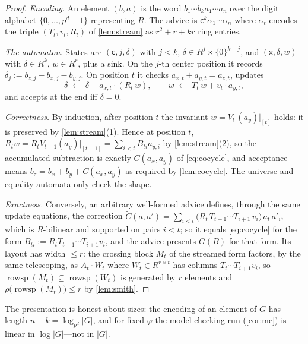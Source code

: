 \documentclass[a4paper,UKenglish,autoref,anonymous]{lipics-v2021}
\newcommand{\R}{R}                                   %
\newcommand{\rs}{\operatorname{rowsp}}
\newcommand{\mrk}{\rho}                              %
\begin{document}
\begin{proof}
\emph{Encoding.} An element $(b, a)$ is the word $b_1 \cdots b_k a_1
\cdots a_n$ over the digit alphabet $\{0, \dots, p^d - 1\}$
representing $\R$. The advice is $\mathsf{c}^k \alpha_1 \cdots \alpha_n$
where $\alpha_t$ encodes the triple $(T_t, v_t, R_t)$ of
\autoref{lem:stream} as $r^2 + r + kr$ ring entries.

\emph{The automaton.} States are $(\mathsf{c}, j, \delta)$ with $j < k$,
$\delta \in \R^{j} \times \{0\}^{k-j}$, and $(\mathsf{x}, \delta, w)$
with $\delta \in \R^k$, $w \in \R^r$, plus a sink. On the $j$-th center
position it records $\delta_j := b_{z,j} - b_{x,j} - b_{y,j}$. On
position $t$ it checks $a_{x,t} + a_{y,t} = a_{z,t}$, updates
\[
  \delta \;\leftarrow\; \delta - a_{x,t} \cdot (R_t\, w), \qquad
  w \;\leftarrow\; T_t\, w + v_t \cdot a_{y,t},
\]
and accepts at the end iff $\delta = 0$.

\emph{Correctness.} By induction, after position $t$ the invariant $w =
V_t \, (a_y)|_{[t]}$ holds: it is preserved by \autoref{lem:stream}(1).
Hence at position $t$, $R_t w = R_t V_{t-1} (a_y)|_{[t-1]} = \sum_{i<t}
B_{ti} a_{y,i}$ by \autoref{lem:stream}(2), so the accumulated
subtraction is exactly $C(a_x, a_y)$ of \eqref{eq:cocycle}, and
acceptance means $b_z = b_x + b_y + C(a_x, a_y)$ as required by
\autoref{lem:cocycle}. The universe and equality automata only check the
shape.

\emph{Exactness.} Conversely, an arbitrary well-formed advice defines,
through the same update equations, the correction $\tilde C(a, a') =
\sum_{i < t} \bigl( R_t\, T_{t-1} \cdots T_{i+1}\, v_i \bigr)\, a_t\,
a'_i$, which is $\R$-bilinear and supported on pairs $i < t$; so it
equals \eqref{eq:cocycle} for the form $B_{ti} := R_t T_{t-1} \cdots
T_{i+1} v_i$, and the advice presents $G(B)$ for that form. Its layout
has width $\le r$: the crossing block $M_t$ of the streamed form
factors, by the same telescoping, as $A_t \cdot W_t$ where $W_t \in
\R^{r \times t}$ has columns $T_t \cdots T_{i+1} v_i$, so $\rs(M_t)
\subseteq \rs(W_t)$ is generated by $r$ elements and
$\mrk\bigl(\rs(M_t)\bigr) \le r$ by \autoref{lem:smith}.
\end{proof}

\begin{remark}
The presentation is honest about sizes: the encoding of an element of
$G$ has length $n + k = \log_{p^d} |G|$, and for fixed $\varphi$ the
model-checking run (\autoref{cor:mc}) is linear in $\log|G|$---not in
$|G|$.
\end{remark}
\end{document}
